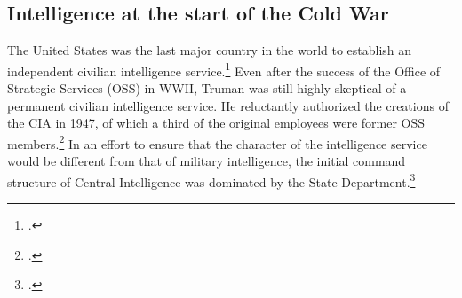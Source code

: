 \documentclass{memoir}
\begin{document}
\begin{refsegment}


\subsection{Intelligence at the start of the Cold War}


The United States was the last major country in the world to establish an independent civilian intelligence service.\footcite[p.~35]{olson_fair_2006} Even after the success of the Office of Strategic Services (OSS) in WWII, Truman was still highly skeptical of a permanent civilian intelligence service. He reluctantly authorized the creations of the CIA in 1947, of which a third of the original employees were former OSS members.\footcite[p.~37]{olson_fair_2006} In an effort to ensure that the character of the intelligence service would be different from that of military intelligence, the initial command structure of Central Intelligence was dominated by the State Department.\footcite{troy_truman_1993}


\end{refsegment}
\end{document}
